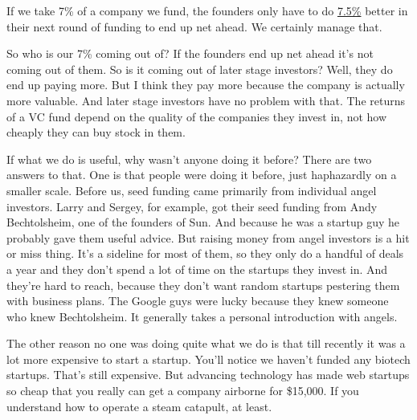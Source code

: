 If
                  we take 7\% of a company we fund, the founders only have to do
                  \href{http://www.paulgraham.com/equity.html}{7.5\%} better in their next round of
                  funding to end up net ahead. We certainly manage that.

So
                  who is our 7\% coming out of? If the founders end up net ahead
                  it's not coming out of them. So is it coming out of later
                  stage investors? Well, they do end up paying more. But I think
                  they pay more because the company is actually more valuable.
                  And later stage investors have no problem with that. The
                  returns of a VC fund depend on the quality of the companies
                  they invest in, not how cheaply they can buy stock in them.

If
                  what we do is useful, why wasn't anyone doing it before? There
                  are two answers to that. One is that people were doing it
                  before, just haphazardly on a smaller scale. Before us, seed
                  funding came primarily from individual angel investors. Larry
                  and Sergey, for example, got their seed funding from Andy
                  Bechtolsheim, one of the founders of Sun. And because he was a
                  startup guy he probably gave them useful advice. But raising
                  money from angel investors is a hit or miss thing. It's a
                  sideline for most of them, so they only do a handful of deals
                  a year and they don't spend a lot of time on the startups they
                  invest in. And they're hard to reach, because they don't want
                  random startups pestering them with business plans. The Google
                  guys were lucky because they knew someone who knew
                  Bechtolsheim. It generally takes a personal introduction with
                  angels.

The other reason no one was doing quite
                  what we do is that till recently it was a lot more expensive
                  to start a startup. You'll notice we haven't funded any
                  biotech startups. That's still expensive. But advancing
                  technology has made web startups so cheap that you really can
                  get a company airborne for \$15,000. If you understand how to
                  operate a steam catapult, at least.

